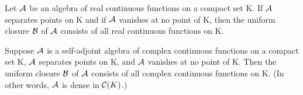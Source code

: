 
\begin{theorem} %
  \label{thm:chap7:stone_weierstrass_real}
  Let $\mathcal{A}$ be an algebra of real continuous functions on
  a compact set K. If $\mathcal{A}$ separates points on K and if
  $\mathcal{A}$ vanishes at no point of K, then the uniform
  closure $\mathcal{B}$ of $\mathcal{A}$ consists of all real
  continuous functions on K.
\end{theorem}



\begin{theorem} %
  \label{thm:chap7:stone_weierstrass_complex}
  Suppose $\mathcal{A}$ is a self-adjoint algebra of complex
  continuous functions on a compact set K, $\mathcal{A}$ separates
  points on K, and $\mathcal{A}$ vanishes at no point of K. Then
  the uniform closure $\mathcal{B}$ of $\mathcal{A}$ consists
  of all complex continuous functions on K. (In other words,
  $\mathcal{A}$ is dense in $\mathcal{C}(K)$.)
\end{theorem}

